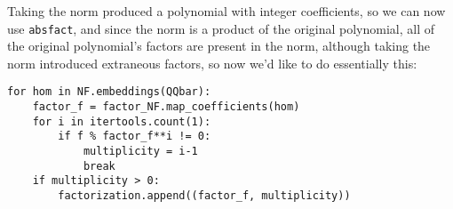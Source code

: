\documentclass{article}
\newcommand{\Bold}[1]{\mathbf{#1}}
\newcommand{\CC}{\Bold{C}}
\newcommand{\QQ}{\Bold{Q}}
\newcommand{\Norm}{{\rm Norm}}
\newcommand{\QQbar}{\overline{\QQ}}
\begin{document}






Taking the norm produced a polynomial with integer coefficients,
so we can now use {\tt absfact}, and since the norm is a product
of the original polynomial, all of the original polynomial's
factors are present in the norm, although taking the norm
introduced extraneous factors, so now we'd
like to do essentially this:

\begin{verbatim}
for hom in NF.embeddings(QQbar):
    factor_f = factor_NF.map_coefficients(hom)
    for i in itertools.count(1):
        if f % factor_f**i != 0:
            multiplicity = i-1
            break
    if multiplicity > 0:
        factorization.append((factor_f, multiplicity))
\end{verbatim}
\end{document}
